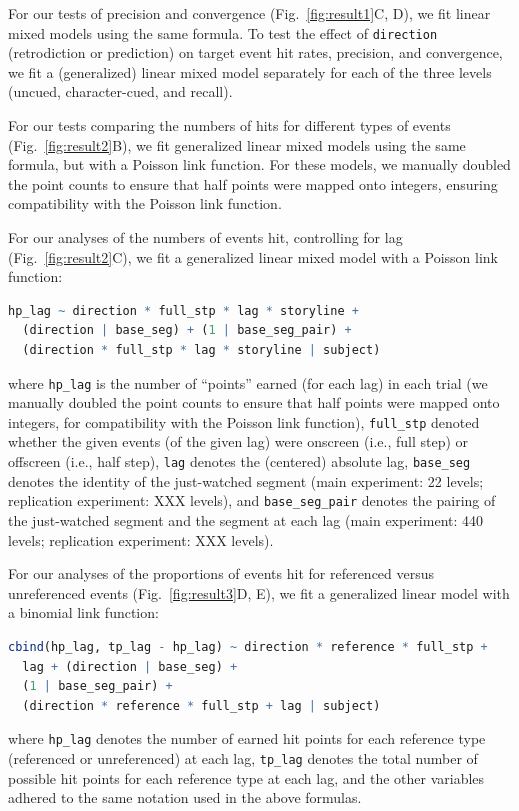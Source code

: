 \documentclass[10pt]{article}
\begin{document}
For our tests of precision and convergence (Fig.~\ref{fig:result1}C, D), we fit linear mixed models using the same formula. To test the effect of \texttt{direction} (retrodiction or prediction) on target event hit rates, precision, and convergence, we fit a (generalized) linear mixed model separately for each of the three levels (uncued, character-cued, and recall).

For our tests comparing the numbers of hits for different types of events (Fig.~\ref{fig:result2}B), we fit generalized linear mixed models using the same formula, but with a Poisson link function. For these models, we manually doubled the point counts to ensure that half points were mapped onto integers, ensuring compatibility with the Poisson link function.

For our analyses of the numbers of events hit, controlling for lag (Fig.~\ref{fig:result2}C), we fit a generalized linear mixed model with a Poisson link function:
\begin{lstlisting}[language=R]
  hp_lag ~ direction * full_stp * lag * storyline +
  (direction | base_seg) + (1 | base_seg_pair) +
  (direction * full_stp * lag * storyline | subject)
  \end{lstlisting}
where \texttt{hp\_lag} is the number of ``points'' earned (for each lag) in each trial (we manually doubled the point counts to ensure that half points were mapped onto integers, for compatibility with the Poisson link function), \texttt{full\_stp} denoted whether the given events (of the given lag) were onscreen (i.e., full step) or offscreen (i.e., half step), \texttt{lag} denotes the (centered) absolute lag, \texttt{base\_seg} denotes the identity of the just-watched segment (main experiment: 22 levels; replication experiment: XXX levels), and \texttt{base\_seg\_pair} denotes the pairing of the just-watched segment and the segment at each lag (main experiment: 440 levels; replication experiment: XXX levels).

For our analyses of the proportions of events hit for referenced versus unreferenced events (Fig.~\ref{fig:result3}D, E), we fit a generalized linear model with a binomial link function:
\begin{lstlisting}[language=R]
  cbind(hp_lag, tp_lag - hp_lag) ~ direction * reference * full_stp +
  lag + (direction | base_seg) +
  (1 | base_seg_pair) +
  (direction * reference * full_stp + lag | subject)
\end{lstlisting}
where \texttt{hp\_lag} denotes the number of earned hit points for each reference type (referenced or unreferenced) at each lag, \texttt{tp\_lag} denotes the total number of possible hit points for each reference type at each lag, and the other variables adhered to the same notation used in the above formulas.
\end{document}
